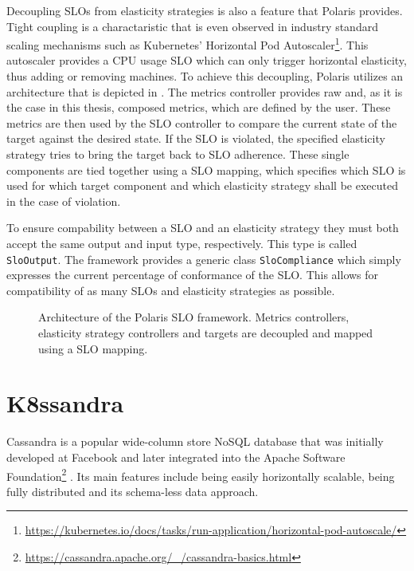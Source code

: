 Decoupling SLOs from elasticity strategies is also a feature that Polaris provides. Tight coupling is a charactaristic that is even observed in industry standard scaling mechanisms such as Kubernetes' Horizontal Pod Autoscaler\footnote{\raggedright\url{https://kubernetes.io/docs/tasks/run-application/horizontal-pod-autoscale/}}. This autoscaler provides a CPU usage SLO which can only trigger horizontal elasticity, thus adding or removing machines. To achieve this decoupling, Polaris utilizes an architecture that is depicted in . The metrics controller provides raw and, as it is the case in this thesis, composed metrics, which are defined by the user. These metrics are then used by the SLO controller to compare the current state of the target against the desired state. If the SLO is violated, the specified elasticity strategy tries to bring the target back to SLO adherence. These single components are tied together using a SLO mapping, which specifies which SLO is used for which target component and which elasticity strategy shall be executed in the case of violation. 

To ensure compability between a SLO and an elasticity strategy they must both accept the same output and input type, respectively. This type is called \texttt{SloOutput}. The framework provides a generic class \texttt{SloCompliance} which simply expresses the current percentage of conformance of the SLO. This allows for compatibility of as many SLOs and elasticity strategies as possible.

\begin{figure}
    \centering
    \caption{Architecture of the Polaris SLO framework. Metrics controllers, elasticity strategy controllers and targets are decoupled and mapped using a SLO mapping.}
    \label{fig:polaris-architecture}
\end{figure}

\section{K8ssandra}
\label{sec:k8ssandra}

Cassandra is a popular wide-column store NoSQL database that was initially developed at Facebook and later integrated into the Apache Software Foundation\footnote{\url{https://cassandra.apache.org/_/cassandra-basics.html}\label{fn:cassandra-basics}} \cite{lakshmanCassandraDecentralizedStructured2010}. Its main features include being easily horizontally scalable, being fully distributed and its schema-less data approach.

